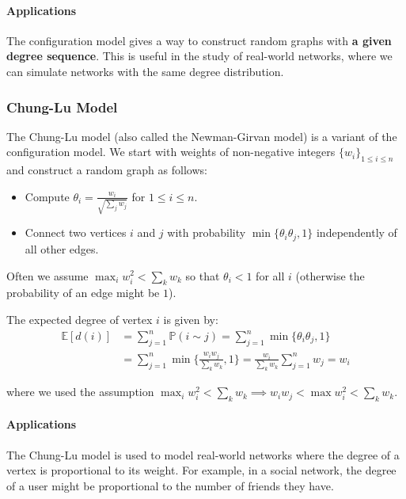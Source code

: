 \documentclass{article}
\begin{document}
\paragraph{Applications}
    The configuration model gives a way to construct random graphs with \textbf{a given degree sequence}. This is useful in the study of real-world networks, where we can simulate networks with the same degree distribution.


\subsubsection{Chung-Lu Model}

The Chung-Lu model (also called the Newman-Girvan model) is a variant of the configuration model. We start with weights of non-negative integers $\{w_i\}_{1\leq i \leq n}$ and construct a random graph as follows:
\begin{itemize}
    \item Compute $\theta_i = \frac{w_i}{\sqrt{\sum_j w_j}}$ for $1\leq i \leq n$.
    \item Connect two vertices $i$ and $j$ with probability $\min \{\theta_i \theta_j, 1\}$ independently of all other edges.
\end{itemize}

Often we assume $\max_i w_i^2 < \sum_k w_k$ so that $\theta_i < 1$ for all $i$ (otherwise the probability of an edge might be $1$).  

The expected degree of vertex $i$ is given by:
\begin{align*}
    \mathbb{E}[d(i)] &= \sum_{j=1}^{n} \mathbb{P}(i \sim j) = \sum_{j=1}^{n} \min \{\theta_i \theta_j, 1\} \\
    &= \sum_{j=1}^{n} \min \{\frac{w_iw_j}{\sum_k w_k}, 1\} = \frac{w_i}{\sum_k w_k} \sum_{j=1}^{n} w_j = w_i
\end{align*}

where we used the assumption $\max_i w_i^2 < \sum_k w_k \implies w_iw_j < \max w_i^2 < \sum_k w_k$. 

\paragraph{Applications}
    The Chung-Lu model is used to model real-world networks where the degree of a vertex is proportional to its weight. For example, in a social network, the degree of a user might be proportional to the number of friends they have.
\end{document}

